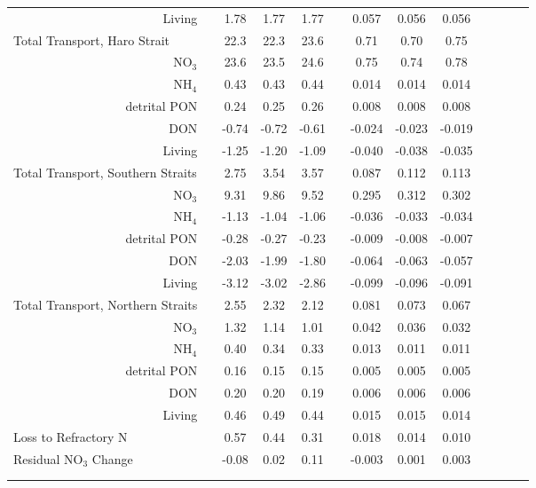 \begin{tabular}{lrcccccccccccc}
       & Living & & 1.78 & 1.77 & 1.77 & & 0.057 & 0.056 & 0.056 & &  &  &  \\
     \multicolumn{2}{l}{ Total Transport, Haro Strait } & & 22.3 & 22.3 & 23.6  & & 0.71 & 0.70 & 0.75 & &  &  &  \\
       & NO$_3$ & & 23.6 & 23.5 & 24.6 & & 0.75 & 0.74 & 0.78 & &  &  &  \\
       & NH$_4$ & & 0.43 & 0.43 & 0.44 & & 0.014 & 0.014 & 0.014 & &  &  &  \\
       & detrital PON & & 0.24 & 0.25 & 0.26 & & 0.008 & 0.008 & 0.008 & &  &  &  \\
       & DON & & -0.74 & -0.72 & -0.61 & & -0.024 & -0.023 & -0.019 & &  &  &  \\
       & Living & & -1.25 & -1.20 & -1.09 & & -0.040 & -0.038 & -0.035 & &  &  &  \\
     \multicolumn{2}{l}{ Total Transport, Southern Straits } & & 2.75 & 3.54 & 3.57 & & 0.087 & 0.112 & 0.113 & &  &  &  \\
       & NO$_3$ & & 9.31 & 9.86 & 9.52 & & 0.295 & 0.312 & 0.302 & &  &  &  \\
       & NH$_4$ & & -1.13 & -1.04 & -1.06 & & -0.036 & -0.033 & -0.034 & &  &  &  \\
       & detrital PON & & -0.28 & -0.27 & -0.23 & & -0.009 & -0.008 & -0.007 & &  &  &  \\
       & DON & & -2.03 & -1.99 & -1.80 & & -0.064 & -0.063 & -0.057 & &  &  &  \\
       & Living & & -3.12 & -3.02 & -2.86 & & -0.099 & -0.096 & -0.091 & &  &  &  \\
     \multicolumn{2}{l}{ Total Transport, Northern Straits } & & 2.55 & 2.32 & 2.12 & & 0.081 & 0.073 & 0.067 & &  &  &  \\
       & NO$_3$ & & 1.32 & 1.14 & 1.01 & & 0.042 & 0.036 & 0.032 & &  &  &  \\
       & NH$_4$ & & 0.40 & 0.34 & 0.33 & & 0.013 & 0.011 & 0.011 & &  &  &  \\
       & detrital PON & & 0.16 & 0.15 & 0.15 & & 0.005 & 0.005 & 0.005 & &  &  &  \\
       & DON & & 0.20 & 0.20 & 0.19 & & 0.006 & 0.006 & 0.006 & &  &  &  \\
       & Living & & 0.46 & 0.49 & 0.44 & & 0.015 & 0.015 & 0.014 & &  &  &  \\
     \multicolumn{2}{l}{ Loss to Refractory N } & & 0.57 & 0.44 & 0.31 & & 0.018 & 0.014 & 0.010 & &  &  &  \\
     \multicolumn{2}{l}{ Residual NO$_3$ Change } & & -0.08 & 0.02 & 0.11 & & -0.003 & 0.001 & 0.003 & &  &  &  \\
   \midrule
 \\ \\   \end{tabular}
